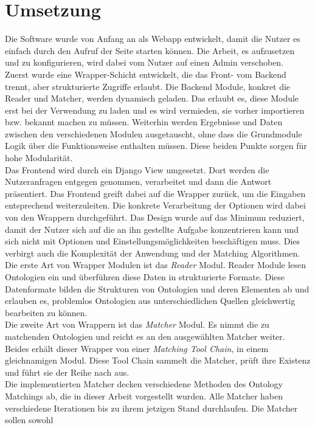 \section{Umsetzung}
Die Software wurde von Anfang an als Webapp entwickelt, damit die Nutzer es
einfach durch den Aufruf der Seite starten können. Die Arbeit, es aufzusetzen
und zu konfigurieren, wird dabei vom Nutzer auf einen Admin verschoben.\\
Zuerst wurde eine Wrapper-Schicht entwickelt, die das Front- vom Backend
trennt, aber strukturierte Zugriffe erlaubt. Die Backend Module, konkret die
Reader und Matcher, werden dynamisch geladen. Das erlaubt es, diese Module erst
bei der Verwendung zu laden und es wird vermieden, sie vorher importieren bzw.
bekannt machen zu müssen. Weiterhin werden Ergebnisse und Daten zwischen den
verschiedenen Modulen ausgetauscht, ohne dass die Grundmodule Logik über die
Funktionsweise enthalten müssen. Diese beiden Punkte sorgen für hohe
Modularität.\\
Das Frontend wird durch ein Django View umgesetzt. Dort werden die
Nutzeranfragen entgegen genommen, verarbeitet und dann die Antwort
präsentiert. Das Frontend greift dabei auf die Wrapper zurück, um die Eingaben
entsprechend weiterzuleiten. Die konkrete Verarbeitung der Optionen wird dabei
von den Wrappern durchgeführt. Das Design wurde auf das Minimum reduziert, damit
der Nutzer sich auf die an ihn gestellte Aufgabe konzentrieren kann und sich nicht
mit Optionen und Einstellungsmöglichkeiten beschäftigen muss. Dies verbirgt
auch die Komplexität der Anwendung und der Matching Algorithmen.\\
Die erste Art von Wrapper Modulen ist das \textit{Reader} Modul. Reader Module
lesen Ontologien ein und überführen diese Daten in strukturierte Formate.
Diese Datenformate bilden die Strukturen von Ontologien und deren Elementen ab
und erlauben es, problemlos Ontologien aus unterschiedlichen Quellen
gleichwertig bearbeiten zu können.\\
Die zweite Art von Wrappern ist das \textit{Matcher} Modul. Es nimmt die zu
matchenden Ontologien und reicht es an den ausgewählten Matcher weiter. Beides erhält
dieser Wrapper von einer \textit{Matching Tool Chain}, in einem
gleichnamigen Modul. Diese Tool Chain sammelt die Matcher, prüft ihre
Existenz und führt sie der Reihe nach aus.\\
Die implementierten Matcher decken verschiedene Methoden des Ontology Matchings
ab, die in dieser Arbeit vorgestellt wurden. Alle Matcher haben verschiedene
Iterationen bis zu ihrem jetzigen Stand durchlaufen. Die Matcher sollen sowohl
